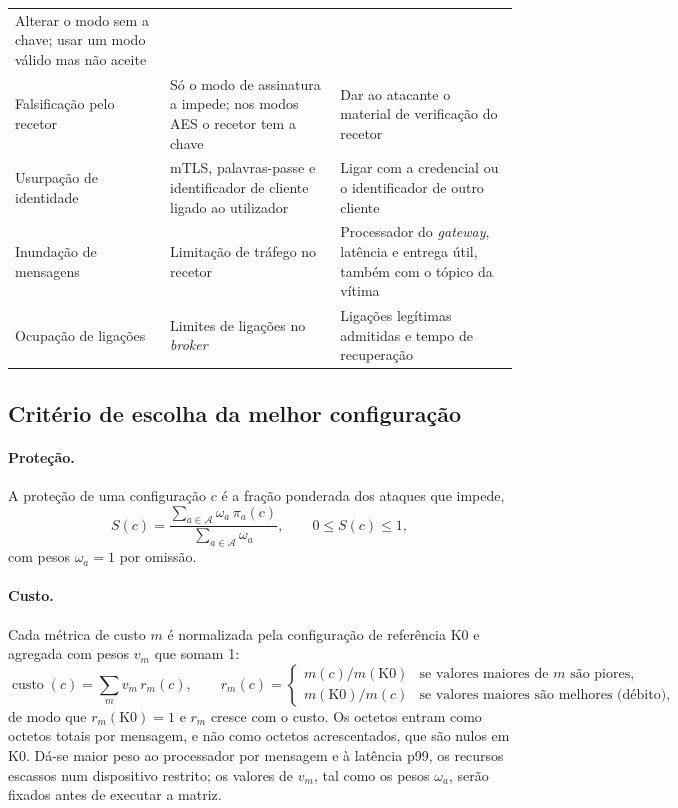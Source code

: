 \begin{table}[ht]
\begin{tabularx}{\textwidth}{@{}L{3.0cm}YY@{}}
      Alterar o modo sem a chave; usar um modo válido mas não aceite \\
    Falsificação pelo recetor & Só o modo de assinatura a impede; nos modos AES o
      recetor tem a chave & Dar ao atacante o material de verificação do recetor \\
    Usurpação de identidade & mTLS, palavras-passe e identificador de cliente ligado
      ao utilizador & Ligar com a credencial ou o identificador de outro cliente \\
    Inundação de mensagens & Limitação de tráfego no recetor & Processador do
      \emph{gateway}, latência e entrega útil, também com o tópico da vítima \\
    Ocupação de ligações~\cite{vaccari2020slowite} & Limites de ligações no
      \emph{broker} & Ligações legítimas admitidas e tempo de recuperação \\
    \bottomrule
  \end{tabularx}
\end{table}

\subsection{Critério de escolha da melhor configuração}
\label{sec:criterio}

\paragraph{Proteção.} A proteção de uma configuração $c$ é a fração ponderada dos
ataques que impede,
\begin{equation}
  S(c) = \frac{\sum_{a \in \mathcal{A}} \omega_a\, \pi_a(c)}{\sum_{a \in \mathcal{A}} \omega_a},
  \qquad 0 \le S(c) \le 1,
  \label{eq:protecao}
\end{equation}
com pesos $\omega_a = 1$ por omissão.

\paragraph{Custo.} Cada métrica de custo $m$ é normalizada pela configuração de
referência K0 e agregada com pesos $v_m$ que somam 1:
\begin{equation}
  \operatorname{custo}(c) = \sum_{m} v_m\, r_m(c), \qquad
  r_m(c) = \begin{cases}
    m(c) / m(\mathrm{K0}) & \text{se valores maiores de } m \text{ são piores,}\\
    m(\mathrm{K0}) / m(c) & \text{se valores maiores são melhores (débito),}
  \end{cases}
  \label{eq:custo}
\end{equation}
de modo que $r_m(\mathrm{K0}) = 1$ e $r_m$ cresce com o custo. Os octetos entram como
octetos totais por mensagem, e não como octetos acrescentados, que são nulos em K0.
Dá-se maior peso ao processador por mensagem e à latência p99, os recursos escassos
num dispositivo restrito; os valores de $v_m$, tal como os pesos $\omega_a$, serão
fixados antes de executar a matriz.

